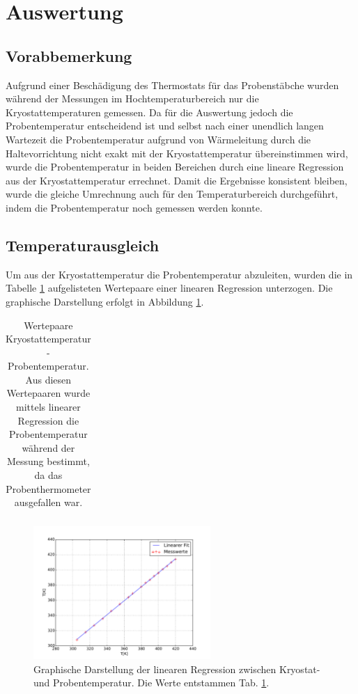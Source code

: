 \section{Auswertung}
\subsection{Vorabbemerkung}
Aufgrund einer Beschädigung des Thermostats für das Probenstäbche wurden während der Messungen im Hochtemperaturbereich nur die Kryostattemperaturen gemessen. Da für die Auswertung jedoch die Probentemperatur entscheidend ist und selbst nach einer unendlich langen Wartezeit die Probentemperatur aufgrund von Wärmeleitung durch die Haltevorrichtung nicht exakt mit der Kryostattemperatur übereinstimmen wird, wurde die Probentemperatur in beiden Bereichen durch eine lineare Regression aus der Kryostattemperatur errechnet. Damit die Ergebnisse konsistent bleiben, wurde die gleiche Umrechnung auch für den Temperaturbereich durchgeführt, indem die Probentemperatur noch gemessen werden konnte.
\subsection{Temperaturausgleich}
Um aus der Kryostattemperatur die Probentemperatur abzuleiten, wurden die in Tabelle \ref{tab:cryoSample} aufgelisteten Wertepaare einer linearen Regression unterzogen. Die graphische Darstellung erfolgt in Abbildung \ref{fig:linFit}.
\begin{table}[htbp]
	\begin{tabular}{c|c}
		
	\end{tabular}
	\caption{Wertepaare Kryostattemperatur - Probentemperatur. Aus diesen Wertepaaren wurde mittels linearer Regression die Probentemperatur während der Messung bestimmt, da das Probenthermometer ausgefallen war.}
	\label{tab:cryoSample}
\end{table}
\begin{figure}[htbp]
	\includegraphics[width=0.6\textwidth]{../auswertung/cryoSampleFit/01_regressionTemp.pdf}
	\caption{Graphische Darstellung der linearen Regression zwischen Kryostat- und Probentemperatur. Die Werte entstammen Tab. \ref{tab:cryoSample}.}
	\label{fig:linFit}
\end{figure}

